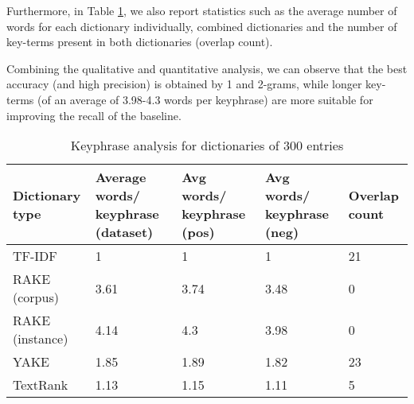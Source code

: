 Furthermore, in Table \ref{tab:stats}, we also report statistics such as the average number of words for each dictionary individually, combined dictionaries and the number of key-terms present in both dictionaries (overlap count). 

Combining the qualitative and quantitative analysis, we can observe that the best accuracy (and high precision) is obtained by 1 and 2-grams, while longer key-terms (of an average of 3.98-4.3 words per keyphrase) are more suitable for improving the recall of the baseline.

    \begin{table}[H]%
        \centering
        \begin{tabular}{|p{2.7cm}|p{2.6cm}|p{2cm}|p{2cm}|p{1cm}|}
        \hline
        Dictionary type& Average words/ keyphrase (dataset)& Avg words/ keyphrase (pos) &Avg words/ keyphrase (neg) & Overlap count\\\hline
        
        TF-IDF &1&1&1&21\\ \hline
        RAKE (corpus)&3.61&3.74&3.48&0\\ \hline
        RAKE (instance)&4.14&4.3&3.98&0\\ \hline
        YAKE&1.85&1.89&1.82&23\\ \hline
        TextRank&1.13&1.15&1.11&5\\ \hline
        
        
        \end{tabular}
        \caption{Keyphrase analysis for dictionaries of 300 entries}
        \label{tab:stats}
    \end{table}

